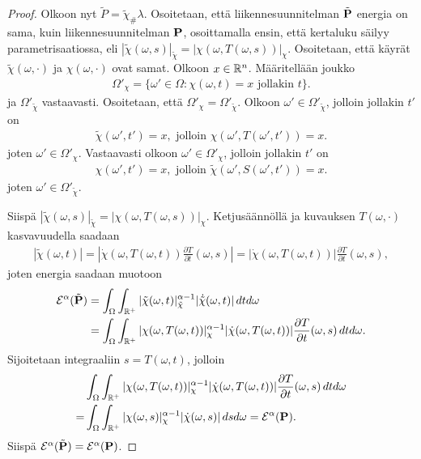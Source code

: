 \documentclass[12pt,oneside,a4paper]{amsbook} %
\begin{document}
\begin{proof}
     Olkoon nyt $\tilde P = \tilde \chi_\# \lambda$. Osoitetaan, että liikennesuunnitelman $\tilde \P$ energia on sama, kuin liikennesuunnitelman $\P$, osoittamalla ensin, että kertaluku säilyy parametrisaatiossa, eli $|\tilde \chi(\omega, s)|_{\tilde \chi} = |\chi(\omega, T(\omega, s))|_\chi$. Osoitetaan, että käyrät $\tilde \chi(\omega, \cdot)$ ja $\chi(\omega, \cdot)$ ovat samat. Olkoon $x \in \R^n$. Määritellään joukko
    \begin{align*}
        \Omega'_\chi = \{\omega' \in \Omega : \chi(\omega, t) = x \text{ jollakin } t\}.
    \end{align*}
    ja $\Omega'_{\tilde \chi}$ vastaavasti. Osoitetaan, että $\Omega'_\chi = \Omega'_{\tilde \chi}$. Olkoon $\omega' \in \Omega'_{\tilde \chi}$, jolloin jollakin $t'$ on
    \begin{align*}
        \tilde \chi(\omega', t') = x, \text{ jolloin }  \chi(\omega', T(\omega', t')) = x.
    \end{align*}
    joten $\omega' \in \Omega'_\chi$. Vastaavasti olkoon $\omega' \in \Omega'_{ \chi}$, jolloin jollakin $t'$ on
    \begin{align*}
        \chi(\omega', t') = x, \text{ jolloin }  \tilde\chi(\omega', S(\omega', t')) = x.
    \end{align*}
    joten $\omega' \in \Omega'_{\tilde \chi}$. 
    
    Siispä $|\tilde \chi(\omega, s)|_{\tilde \chi} = |\chi(\omega, T(\omega, s))|_\chi$. Ketjusäännöllä ja kuvauksen $T(\omega, \cdot)$ kasvavuudella saadaan 
    \begin{align*}
       |\tilde \chi(\omega, t)| = |\dot \chi(\omega, T(\omega, t)) \frac{\partial T}{\partial t}(\omega, s)| = |\dot \chi(\omega, T(\omega, t))| \frac{\partial T}{\partial t}(\omega, s),
    \end{align*}
    joten energia saadaan muotoon 
    \begin{align*}
        \E^\alpha(\tilde \P) &= \int_\Omega \int_{\R^+} |\tilde \chi(\omega, t)|_{\tilde \chi}^{\alpha-1}|\dot{\tilde{\chi}}(\omega, t)|\, dtd\omega \\
        &= \int_\Omega \int_{\R^+} |\chi(\omega, T(\omega, t))|_{\chi}^{\alpha-1} |\dot \chi(\omega, T(\omega, t))| \frac{\partial T}{\partial t}(\omega, s) \, dtd\omega. 
    \end{align*}
    Sijoitetaan integraaliin $s = T(\omega, t)$, jolloin
    \begin{align*}
        &\int_\Omega \int_{\R^+} |\chi(\omega, T(\omega, t))|_{\chi}^{\alpha-1} |\dot \chi(\omega, T(\omega, t))| \frac{\partial T}{\partial t}(\omega, s) \, dtd\omega \\
         =  &\int_\Omega \int_{\R^+} |\chi(\omega, s)|_{\chi}^{\alpha-1} |\dot \chi(\omega, s)| \, dsd\omega = \E^\alpha(\P).
    \end{align*}
    Siispä $\E^\alpha(\tilde \P) = \E^\alpha(\P)$.
    
\end{proof}
\end{document}
